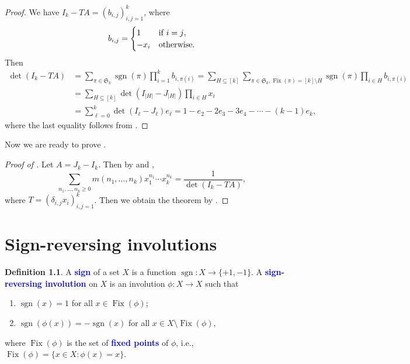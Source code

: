 \documentclass[oneside]{book}
\numberwithin{equation}{section}
\theoremstyle{definition}
\newtheorem{defn}[thm]{Definition}
\newcommand\Fix{\operatorname{Fix}}
\newcommand\sgn{\operatorname{sgn}}
\newcommand\sym{\mathfrak{S}}
\renewcommand\emph[1]{\textcolor{blue}{\bf #1}}
\begin{document}
\begin{proof}
  We have \( I_{k}-TA = (b_{i,j})_{i,j=1}^k \),
  where 
  \[
    b_{i,j} =
    \begin{cases}
     1 & \mbox{if \( i=j \)},\\
     -x_i & \mbox{otherwise.}
    \end{cases}
  \]
  Then
  \begin{align*}
    \det(I_{k}-TA)
    &= \sum_{\pi\in \sym_k}  \sgn(\pi) \prod_{i=1}^k b_{i,\pi(i)}
      = \sum_{H\subseteq [k]}\sum_{\pi\in \sym_k, \Fix(\pi) = [k]\setminus H}  \sgn(\pi)
      \prod_{i\in H} b_{i,\pi(i)}\\
    &= \sum_{H\subseteq [k]} \det(I_{|H|}-J_{|H|}) \prod_{i\in H} x_i\\
    &= \sum_{\ell=0}^{k} \det(I_{\ell}-J_{\ell}) e_\ell = 1-e_2-2e_3-3e_4-\cdots-(k-1)e_k,
  \end{align*}
  where the last equality follows from .
\end{proof}

Now we are ready to prove .

\begin{proof}[Proof of ]
  Let \( A = J_k-I_k \). Then by  and ,
\[
  \sum_{n_1,\dots,n_k\geq0} m(n_1,\dots,n_k) x_1^{n_1} \cdots
  x_k^{n_k} = {\frac {1}{\det(I_{k}-TA)}},
\]
where \( T = (\delta_{i,j}x_i)_{i,j=1}^k \). Then we obtain the
theorem by .
\end{proof}

\newpage

\appendix

\chapter{Sign-reversing involutions}
\label{sec:sign-revers-invol}

\begin{defn}
  A \emph{sign} of a set \( X \) is a function
  \( \sgn:X \to \{+1,-1\} \). A \emph{sign-reversing involution} on
  \( X \) is an involution \( \phi:X\to X \) such that
  \begin{enumerate}
  \item \( \sgn(x)=1 \) for all \( x\in \Fix(\phi) \);
  \item \( \sgn(\phi(x)) = -\sgn(x) \) for all
  \( x\in X \setminus \Fix(\phi) \),
  \end{enumerate}
  where \( \Fix(\phi) \) is the set of \emph{fixed points} of
  \( \phi \), i.e., \( \Fix(\phi) = \{x\in X: \phi(x) = x \} \).
\end{defn}
\end{document}

